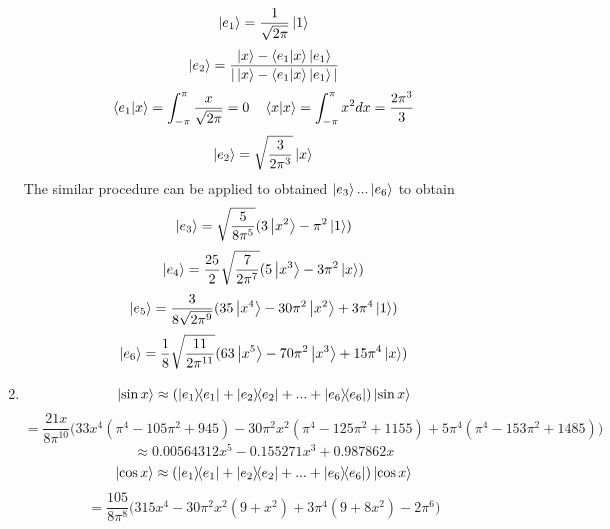 \begin{sol}
\begin{enumerate}[label=\textbf{(\alph*)}]
\begin{equation}
	\ket{e_1}=\frac{1}{\sqrt{2\pi}}\ket 1
\end{equation}
\begin{equation}
	\ket{e_2}=\frac{\ket x-\braket{e_1}{x} \ket{e_1}}{|\ket x-\braket{e_1}{x} \ket{e_1}|}
\end{equation}
\begin{equation}
	\braket{e_1}{x}=\int_{-\pi}^\pi \frac{x}{\sqrt{2\pi}}=0
\,\,\,\,\,\, \braket{x}{x}=\int_{-\pi}^\pi x^2 dx=\frac{2\pi^3}{3}
\end{equation}\begin{equation}
	\ket{e_2}=\sqrt{\frac{3}{2\pi^3}}\ket x
\end{equation} 
The similar procedure can be applied to obtained $\ket{e_3}...\ket{e_6}$ to obtain
\begin{equation}
	\ket{e_3}=\sqrt{\frac{5}{8\pi^5}}(3\ket{x^2}-\pi^2\ket 1)
\end{equation}
\begin{equation}
	\ket {e_4}=\frac{25}{2}\sqrt{\frac{7}{2\pi^7}}(5\ket{x^3}-3\pi^2\ket x)
\end{equation} \begin{equation}
	\ket{e_5}=\frac{3}{8\sqrt{2\pi^9}}(35\ket{x^4}-30\pi^2\ket{x^2}+3\pi^4\ket 1)
\end{equation} 
\begin{equation}
	\ket{e_6}=\frac{1}{8}\sqrt{\frac{11}{2\pi^{11}}}(63\ket{x^5}-70\pi^2\ket{x^3}+15\pi^4\ket{x})
\end{equation} 
\item
\begin{equation}
	\ket{\sin x}\approx(\ketbra{e_1}{e_1}+\ketbra{e_2}{e_2}+...+\ketbra{e_6}{e_6})\ket{\sin x}
\end{equation} \begin{equation}
	=\frac{21x}{8\pi^{10}}\Big(33x^4(\pi^4-105\pi^2+945)-30\pi^2x^2(\pi^4-125\pi^2+1155)+5\pi^4(\pi^4-153\pi^2+1485)\Big)
\end{equation}
\begin{equation}
	\approx 0.00564312x^5-0.155271x^3+0.987862x
\end{equation} \begin{equation}
	\ket{\cos x}\approx(\ketbra{e_1}{e_1}+\ketbra{e_2}{e_2}+...+\ketbra{e_6}{e_6})\ket{\cos x}
\end{equation}\begin{equation}
	=\frac{105}{8\pi^8}\Big(315 x^4 - 30 \pi^2 x^2 (9 + x^2) + 3 \pi^4 (9 + 8 x^2)-2 \pi^6\Big)
\end{equation} \begin{equation}

\end{equation}
\end{enumerate}
\end{sol}
